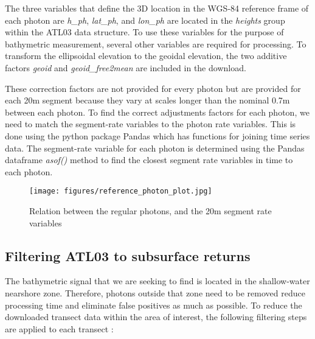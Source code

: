 The three variables that define the 3D location in the WGS-84 reference frame of each photon are \emph{h\_ph}, \emph{lat\_ph}, and \emph{lon\_ph} are located in the \emph{heights} group within the ATL03 data structure. To use these variables for the purpose of bathymetric measurement, several other variables are required for processing. To transform the ellipsoidal elevation to the geoidal elevation, the two additive factors \emph{geoid} and \emph{geoid\_free2mean} are included in the download.

These correction factors are not provided for every photon but are provided for each 20m segment because they vary at scales longer than the nominal 0.7m between each photon. To find the correct adjustments factors for each photon, we need to match the segment-rate variables to the photon rate variables. This is done using the python package Pandas \parencite{jeff_reback_2022_6408044,mckinney-proc-scipy-2010} which has functions for joining time series data.  The segment-rate variable for each photon is determined using the Pandas dataframe \emph{asof()} method to find the closest segment rate variables in time to each photon. 

\begin{figure}[h!]
    \centering
    \texttt{[image: figures/reference\_photon\_plot.jpg]}
    \caption{Relation between the regular photons, and the 20m segment rate variables}
    \label{fig:reference-photon_match} 
\end{figure}

\subsection{Filtering ATL03 to subsurface returns}

The bathymetric signal that we are seeking to find is located in the shallow-water nearshore zone. Therefore, photons outside that zone need to be removed reduce processing time and eliminate false positives as much as possible. To reduce the downloaded transect data within the area of interest, the following filtering steps are applied to each transect :


